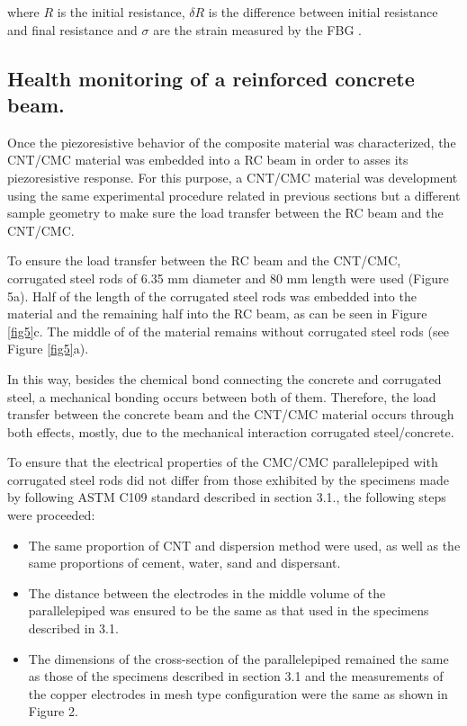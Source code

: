 \documentclass[twocolumn]{bmcart}%
\begin{document}
    
where $R$ is the initial resistance, $\delta R$ is the difference between initial resistance and final resistance and $\sigma$ are the strain measured by the FBG \cite{Pisello2017, Jang2017}.

\subsection{Health monitoring of a reinforced concrete beam.}

Once  the piezoresistive behavior of the composite material was characterized, the CNT/CMC material was embedded into a RC beam in order to asses its piezoresistive response. For this purpose, a CNT/CMC material was development using the same experimental procedure related in previous sections but a different sample geometry to make sure the load transfer between the RC beam and the CNT/CMC.

To ensure the load transfer between the RC beam and the CNT/CMC, corrugated steel rods of 6.35 mm diameter and 80 mm length were used (Figure 5a). Half of the length of the corrugated steel rods was embedded into the material and the remaining half into the RC beam, as can be seen in Figure \ref{fig5}c. The middle of of the material remains without corrugated steel rods (see Figure \ref{fig5}a).

In this way, besides the chemical bond connecting the concrete and corrugated steel, a mechanical bonding occurs between both of them. Therefore, the load transfer between the concrete beam and the CNT/CMC material occurs through both effects, mostly, due to the mechanical interaction corrugated steel/concrete.

To ensure that the electrical properties of the CMC/CMC parallelepiped with corrugated steel rods did not differ from those exhibited by the specimens made by following ASTM C109 standard \cite{ASTMC1092000} described in section 3.1., the following steps were proceeded:

\begin{itemize}
\item The same proportion of CNT and dispersion method were used, as well as the same proportions of cement, water, sand and dispersant.

\item The distance between the electrodes in the middle volume of the parallelepiped was ensured to be the same as that used in the specimens described in 3.1.

\item The dimensions of the cross-section of the parallelepiped remained the same as those of the specimens described in section 3.1 and the measurements of the copper electrodes in mesh type configuration were the same as shown in Figure 2. 
\end{itemize}
\end{document}
